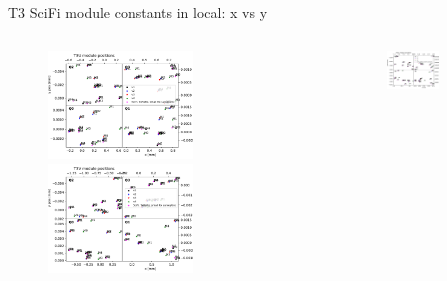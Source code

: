 \documentclass[aspectratio=1610, 12pt]{beamer}
\begin{document}
\begin{frame}{T3 SciFi module constants in local: x vs y}
  \begin{columns}
    \begin{column}[c]{0.5\textwidth}
      \begin{figure}
        \includegraphics[width=0.61\textwidth]{plots/out_x_y_pos/retest_x_vs_y_local_T3U.pdf}
        \includegraphics[width=0.61\textwidth]{plots/out_x_y_pos/retest_x_vs_y_local_T3V.pdf}
      \end{figure}
    \end{column}
    \begin{column}[c]{0.5\textwidth}
      \begin{figure}
        \includegraphics[width=0.61\textwidth]{plots/out_x_y_pos/retest_x_vs_y_local_T3X1.pdf}

\end{figure}
\end{column}
\end{columns}
\end{frame}
\end{document}
